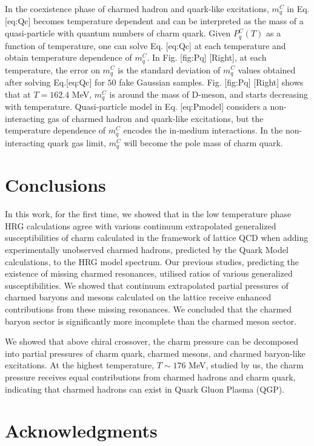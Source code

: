 \documentclass[11pt,a4paper]{article}
\begin{document}
In the coexistence phase of charmed hadron and quark-like excitations, $m^C_q$ in Eq. [eq:Qc] becomes temperature dependent and can be interpreted as the mass of a quasi-particle with quantum numbers of charm quark. Given $P^C_q(T)$ as a function of temperature, one can solve Eq. [eq:Qc] at each temperature and obtain temperature dependence of $m^C_q$. In Fig. [fig:Pq] [Right], at each temperature, the error on $m^C_q$ is the standard deviation of $m^C_q$ values obtained after solving Eq.[eq:Qc] for $50$ fake Gaussian samples. Fig. [fig:Pq] [Right] shows that at $T=162.4$ MeV, $m^C_q$ is around the mass of D-meson, and starts decreasing with temperature. Quasi-particle model in Eq. [eq:Pmodel] considers a non-interacting gas of charmed hadron and quark-like excitations, but the temperature dependence of $m^C_q$ encodes the in-medium interactions. In the non-interacting quark gas limit, $m^C_q$ will become the pole mass of charm quark.

\section{Conclusions}

In this work, for the first time, we showed that in the low temperature phase HRG calculations agree with various continuum extrapolated generalized susceptibilities of charm calculated in the framework of lattice QCD when adding experimentally unobserved charmed hadrons, predicted by the Quark Model calculations, to the HRG model spectrum. Our previous studies, predicting the existence of missing charmed resonances, utilised ratios of various generalized susceptibilities. We showed that continuum extrapolated partial pressures of charmed baryons and mesons calculated on the lattice receive enhanced contributions from these missing resonances. We concluded that the charmed baryon sector is significantly more incomplete than the charmed meson sector.

We showed that above chiral crossover, the charm pressure can be decomposed into partial pressures of charm quark, charmed mesons, and charmed baryon-like excitations. At the highest temperature, $T \sim 176$ MeV, studied by us, the charm pressure receives equal contributions from charmed hadrons and charm quark, indicating that charmed hadrons can exist in Quark Gluon Plasma (QGP).

\section{Acknowledgments}
\end{document}
